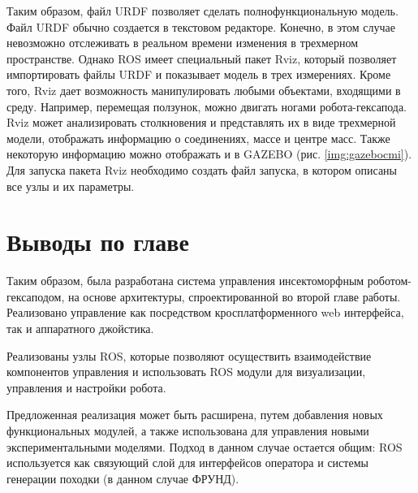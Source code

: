 Таким образом, файл URDF позволяет сделать полнофункциональную модель. Файл URDF обычно создается в текстовом редакторе. Конечно, в этом случае невозможно отслеживать в реальном времени изменения в трехмерном пространстве. Однако ROS имеет специальный пакет Rviz, который позволяет импортировать файлы URDF и показывает модель в трех измерениях. Кроме того, Rviz дает возможность манипулировать любыми объектами, входящими в среду. Например, перемещая ползунок, можно двигать ногами робота-гексапода. Rviz может анализировать столкновения и представлять их в виде трехмерной модели, отображать информацию о соединениях, массе и центре масс. Также некоторую информацию можно отображать и в GAZEBO (рис. \ref{img:gazebocmi}). Для запуска пакета Rviz необходимо создать файл запуска, в котором описаны все узлы и их параметры.

\section{Выводы по главе}

Таким образом, была разработана система управления инсектоморфным роботом-гексаподом, на основе архитектуры, спроектированной во второй главе работы. Реализовано управление как посредством кросплатформенного web интерфейса, так и аппаратного джойстика.

Реализованы узлы ROS, которые позволяют осуществить взаимодействие компонентов управления и использовать ROS модули для визуализации, управления и настройки робота.

Предложенная реализация может быть расширена, путем добавления новых функциональных модулей, а также использована для управления новыми экспериментальными моделями. Подход в данном случае остается общим: ROS используется как связующий слой для интерфейсов оператора и системы генерации походки (в данном случае ФРУНД).
